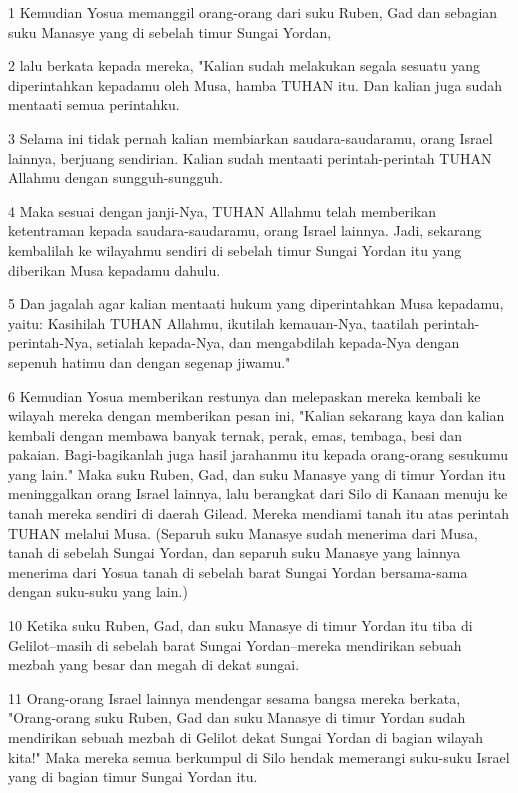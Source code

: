 \par 1 Kemudian Yosua memanggil orang-orang dari suku Ruben, Gad dan sebagian suku Manasye yang di sebelah timur Sungai Yordan,
\par 2 lalu berkata kepada mereka, "Kalian sudah melakukan segala sesuatu yang diperintahkan kepadamu oleh Musa, hamba TUHAN itu. Dan kalian juga sudah mentaati semua perintahku.
\par 3 Selama ini tidak pernah kalian membiarkan saudara-saudaramu, orang Israel lainnya, berjuang sendirian. Kalian sudah mentaati perintah-perintah TUHAN Allahmu dengan sungguh-sungguh.
\par 4 Maka sesuai dengan janji-Nya, TUHAN Allahmu telah memberikan ketentraman kepada saudara-saudaramu, orang Israel lainnya. Jadi, sekarang kembalilah ke wilayahmu sendiri di sebelah timur Sungai Yordan itu yang diberikan Musa kepadamu dahulu.
\par 5 Dan jagalah agar kalian mentaati hukum yang diperintahkan Musa kepadamu, yaitu: Kasihilah TUHAN Allahmu, ikutilah kemauan-Nya, taatilah perintah-perintah-Nya, setialah kepada-Nya, dan mengabdilah kepada-Nya dengan sepenuh hatimu dan dengan segenap jiwamu."
\par 6 Kemudian Yosua memberikan restunya dan melepaskan mereka kembali ke wilayah mereka dengan memberikan pesan ini, "Kalian sekarang kaya dan kalian kembali dengan membawa banyak ternak, perak, emas, tembaga, besi dan pakaian. Bagi-bagikanlah juga hasil jarahanmu itu kepada orang-orang sesukumu yang lain." Maka suku Ruben, Gad, dan suku Manasye yang di timur Yordan itu meninggalkan orang Israel lainnya, lalu berangkat dari Silo di Kanaan menuju ke tanah mereka sendiri di daerah Gilead. Mereka mendiami tanah itu atas perintah TUHAN melalui Musa. (Separuh suku Manasye sudah menerima dari Musa, tanah di sebelah Sungai Yordan, dan separuh suku Manasye yang lainnya menerima dari Yosua tanah di sebelah barat Sungai Yordan bersama-sama dengan suku-suku yang lain.)
\par 10 Ketika suku Ruben, Gad, dan suku Manasye di timur Yordan itu tiba di Gelilot--masih di sebelah barat Sungai Yordan--mereka mendirikan sebuah mezbah yang besar dan megah di dekat sungai.
\par 11 Orang-orang Israel lainnya mendengar sesama bangsa mereka berkata, "Orang-orang suku Ruben, Gad dan suku Manasye di timur Yordan sudah mendirikan sebuah mezbah di Gelilot dekat Sungai Yordan di bagian wilayah kita!" Maka mereka semua berkumpul di Silo hendak memerangi suku-suku Israel yang di bagian timur Sungai Yordan itu.
